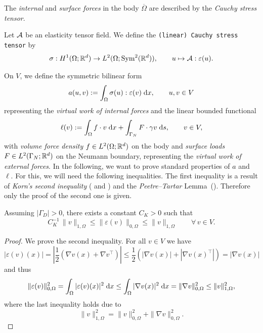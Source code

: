 The {\em internal} and {\em surface forces} in the body $\overline{\Omega}$ are described by the {\em Cauchy stress tensor}.

\begin{definition}
	Let ${\mathcal A}$ be an elasticity tensor field. We define the
		{\tt (linear) Cauchy stress tensor} by
	\begin{equation*}
		\sigma: H^1(\Omega;{\mathbb R}^d)\to L^2(\Omega;\mathrm{Sym}^2({\mathbb R}^d)),\qquad u\mapsto {\mathcal A} : \varepsilon(u).
	\end{equation*}
\end{definition}
On $V$, we define the symmetric bilinear form
\begin{equation}\label{eq:symbil}
	a(u,v):= \int_\Omega \sigma(u):\varepsilon(v)\;{{\mathrm{d}} x},\qquad u,v\in V
\end{equation}
representing the {\em virtual work of internal forces} and the linear bounded functional
\begin{equation}\label{eq:laodfunc}
	\ell(v):= \int_\Omega f\cdot v\;{{\mathrm{d}} x}  + \int_{\Gamma_N} F\cdot \gamma v\;{{\mathrm{d}} s},\qquad  v\in V,
\end{equation}
with {\em volume force density} $f\in L^2(\Omega;{\mathbb R}^d)$ on the body and {\em surface loads} $F\in L^2(\Gamma_N;{\mathbb R}^d)$ on the Neumann boundary, representing the {\em virtual work of external forces}. In the following, we want to prove standard properties of $a$ and $\ell$. For this, we will need the following inequalities. The first inequality is a result of {\em Korn's second inequality} (\cite[Theorem 3.3]{book} and \cite[Section 3.5.2]{book}) and the {\em Peetre--Tartar} Lemma~(\cite[Lemma~3.5]{book}). Therefore only the proof of the second one is given.

\begin{lemma}\label{lem:korn}
	Assuming $|\Gamma_D|>0$, there exists a constant $C_K>0$ such that
	\begin{equation*}
		C_K^{-1}\,\|v\|_{1,\Omega} \le \|\varepsilon(v)\|_{0,\Omega}\le \|v\|_{1,\Omega} \qquad \forall\, v\in V.
	\end{equation*}
\end{lemma}
\begin{proof}
	We prove the second inequality. For all $v\in V$ we have
	\begin{equation*}
		|\varepsilon(v)(x)| = \left|\frac{1}{2}(\nabla v(x) +\nabla v^\top)\right|\le \frac{1}{2}(|\nabla v(x)|+|\nabla v(x)^\top|) = |\nabla v(x)|
	\end{equation*}
	and thus
	\begin{equation*}
		\|\varepsilon(v)\|_{0,\Omega}^2 =\int_\Omega |\varepsilon(v)(x)|^2\;{{\mathrm{d}} x} \le\int_\Omega |\nabla v(x)|^2\;{{\mathrm{d}} x} = \|\nabla v\|_{0,\Omega}^2\le \|v\|_{1,\Omega}^2,
	\end{equation*}
	where the last inequality holds due to
	\begin{equation*}
		\|v\|_{1,\Omega}^2 = \|v\|_{0,\Omega}^2 + \|\nabla v\|_{0,\Omega}^2.
	\end{equation*}
\end{proof}

